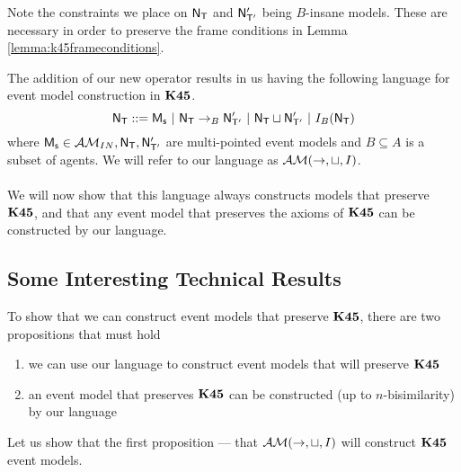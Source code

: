 Note the constraints we place on $\mathrm{\mathsf{N}}_\mathrm{\mathsf{T}}$ and $\mathrm{\mathsf{N}}'_{\mathrm{\mathsf{T}}'}$ being $B$-insane models.
These are necessary in order to preserve the frame conditions in Lemma
\ref{lemma:k45frameconditions}.

\newcommand{\EM}{\ensuremath{\eventClass}}

The addition of our new operator results in us having the following language for
event model construction in $\bf K45$.
\[
	\mathrm{\mathsf{N}}_\mathrm{\mathsf{T}} ::= \mathrm{\mathsf{M_s}} \text{ } | \text{ }\mathrm{\mathsf{N}}_\mathrm{\mathsf{T}} \to_B \mathrm{\mathsf{N}}'_{\mathrm{\mathsf{T}}'} \text{ }|
  \text{ } \mathrm{\mathsf{N}}_\mathrm{\mathsf{T}} \sqcup \mathrm{\mathsf{N}}'_{\mathrm{\mathsf{T}}'} \text{ } | \text{ } I_B(\mathrm{\mathsf{N}}_\mathrm{\mathsf{T}})
\]
where $\mathrm{\mathsf{M_s}} \in \mathcal{AM}_{IN}, \mathrm{\mathsf{N}}_\mathrm{\mathsf{T}}, \mathrm{\mathsf{N}}'_{\mathrm{\mathsf{T}}'}$ are multi-pointed event models and $B \subseteq
A$ is a subset of agents.
We will refer to our language as $\EM(\to,\sqcup,I)$. \\
\\
We will now show that this language always constructs models that preserve $\bf K45$, and that any
event model that preserves the axioms of $\bf K45$ can be constructed by our language.

\subsection{Some Interesting Technical Results}

To show that we can construct event models that preserve $\bf K45$, there are two propositions that
must hold
\begin{enumerate}
	\item we can use our language to construct event models that will preserve $\bf K45$
	\item an event model that preserves $\bf K45$ can be constructed (up to $n$-bisimilarity) by our
		language
\end{enumerate}

Let us show that the first proposition --- that $\EM(\to,\sqcup,I)$ will construct $\bf K45$ event
models.

